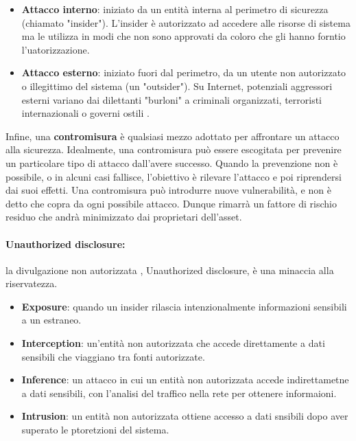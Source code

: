 \begin{itemize}
      \item \textbf{Attacco interno}: iniziato da un entità interna al perimetro
            di sicurezza (chiamato "insider"). L'insider è autorizzato ad accedere alle
            risorse di sistema ma le utilizza in modi che non sono approvati da coloro che
            gli hanno forntio l'uatorizzazione.
      \item \textbf{Attacco esterno}: iniziato fuori dal perimetro, da un utente
            non autorizzato o illegittimo del sistema (un "outsider").
            Su Internet, potenziali aggressori esterni variano dai dilettanti "burloni"
            a criminali organizzati, terroristi internazionali o governi ostili
            .
\end{itemize}

Infine, una \textbf{contromisura} è qualsiasi mezzo adottato per affrontare un
attacco alla sicurezza. Idealmente, una contromisura può essere escogitata per
prevenire un particolare tipo di attacco dall'avere successo.
Quando la prevenzione non è possibile, o in alcuni casi fallisce, l'obiettivo è
rilevare l'attacco e poi riprendersi dai suoi effetti. Una contromisura
può introdurre nuove vulnerabilità, e non è detto che copra da ogni possibile
attacco. Dunque rimarrà un fattore di rischio residuo che andrà minimizzato dai
proprietari dell'asset.

\paragraph{Unauthorized disclosure:} la divulgazione non autorizzata
, Unauthorized disclosure, è una minaccia alla riservatezza.

\begin{itemize}
      \item \textbf{Exposure}: quando un insider rilascia intenzionalmente
            informazioni sensibili a un estraneo.
      \item \textbf{Interception}: un'entità non autorizzata che accede
            direttamente a dati sensibili che viaggiano tra fonti autorizzate.
      \item \textbf{Inference}: un attacco in cui un entità non autorizzata
            accede indirettametne a dati sensibili, con l'analisi del traffico nella rete
            per ottenere informaioni.
      \item \textbf{Intrusion}: un entità non autorizzata ottiene accesso a dati
            snsibili dopo aver superato le ptoretzioni del sistema.
\end{itemize}

